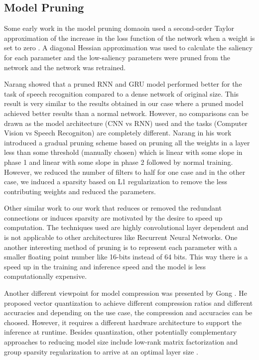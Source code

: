 \subsection{Model Pruning}

Some early work in the model pruning domaoin used a second-order Taylor approximation of the increase in the loss function of the network when a weight is set to zero \cite{lecun1990optimal}. A diagonal Hessian approximation was used to calculate the saliency for each parameter \cite{lecun1990optimal} and the low-saliency parameters were pruned from the network and the network was retrained.


Narang \cite{DBLP:journals/corr/NarangDSE17} showed that a pruned RNN and GRU model performed better for the task of speech recognition compared to a dense network of original size. This result is very similar to the results obtained in our case where a pruned model achieved better results than a normal network. However, no comparisons can be drawn as the model architecture (CNN vs RNN) used and the tasks (Computer Vision vs Speech Recogniton) are completely different.  Narang \cite{DBLP:journals/corr/NarangDSE17} in his work introduced a gradual pruning scheme based on pruning all the weights in a layer
less than some threshold (manually chosen) which is linear with some
slope in phase 1 and linear with some slope in phase 2 followed by
normal training. However, we reduced the number of filters to half for one case and in the other case, we induced a sparsity based on L1 regularization to remove the less contributing weights and reduced the parameters. 


Other similar work \cite{DBLP:journals/corr/AnwarHS15, DBLP:journals/corr/LebedevGROL14, DBLP:journals/corr/ChangpinyoSZ17} to our work that reduces or removed the redundant connections or induces sparsity are motivated by the desire to speed up computation.
The techniques used are highly convolutional layer dependent and is not applicable to other architectures like Recurrent Neural Networks. 
One another interesting method of pruning is to represent each parameter with a smaller floating point number like 16-bits instead of 64 bits. This way there is a speed up in the training and inference speed and the model is less computationally expensive. 

Another different viewpoint for model compression was presented by Gong \cite{DBLP:journals/corr/GongLYB14}. He proposed vector quantization to achieve different compression ratios and different accuracies and depending on the use case, the compression and accuracies can be choosed. However, it requires a different hardware architecture to support the inference at runtime. Besides quantization, other potentially complementary approaches to reducing model size include low-rank matrix factorization \cite{denton2014exploiting, DBLP:journals/corr/LebedevGROL14} and group sparsity regularization to arrive at an optimal layer size \cite{DBLP:conf/nips/AlvarezS16}.

